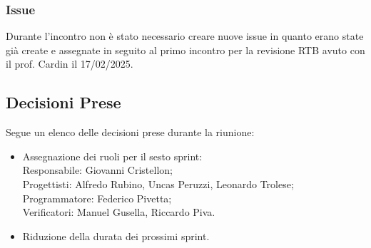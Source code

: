\documentclass[10pt]{article}
\begin{document}
\subsubsection{Issue}
Durante l'incontro non è stato necessario creare nuove issue in quanto erano state già create e assegnate in seguito al primo incontro per la revisione RTB avuto con il prof. Cardin il 17/02/2025.

\subsection{Decisioni Prese}
Segue un elenco delle decisioni prese durante la riunione:
\begin{itemize}
    \item   Assegnazione dei ruoli per il sesto sprint:\\
            Responsabile: Giovanni Cristellon;\\
            Progettisti: Alfredo Rubino, Uncas Peruzzi, Leonardo Trolese;\\
            Programmatore: Federico Pivetta;\\
            Verificatori: Manuel Gusella, Riccardo Piva.
    \item   Riduzione della durata dei prossimi sprint.
\end{itemize}
\end{document}
